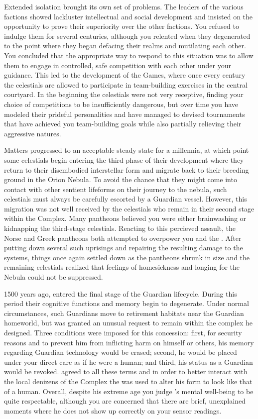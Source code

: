 \documentclass[char]{guardians}
\begin{document}
Extended isolation brought its own set of problems. The leaders of the various factions showed lackluster intellectual and social development and insisted on the opportunity to prove their superiority over the other factions. You refused to indulge them for several centuries, although you relented when they degenerated to the point where they began defacing their realms and mutilating each other. You concluded that the appropriate way to respond to this situation was to allow them to engage in controlled, safe competition with each other under your guidance. This led to the development of the Games, where once every century the celestials are allowed to participate in team-building exercises in the central courtyard. In the beginning the celestials were not very receptive, finding your choice of competitions to be insufficiently dangerous, but over time you have modeled their prideful personalities and have managed to devised tournaments that have achieved you team-building goals while also partially relieving their aggressive natures.

Matters progressed to an acceptable steady state for a millennia, at which point some celestials begin entering the third phase of their development where they return to their disembodied interstellar form and migrate back to their breeding ground in the Orion Nebula. To avoid the chance that they might come into contact with other sentient lifeforms on their journey to the nebula, such celestials must always be carefully escorted by a Guardian vessel. However, this migration was not well received by the celestials who remain in their second stage within the Complex. Many pantheons believed you were either brainwashing or kidnapping the third-stage celestials. Reacting to this percieved assault, the Norse and Greek pantheons both attempted to overpower you and the \cWarden{}. After putting down several such uprisings and repairing the resulting damage to the systems, things once again settled down as the pantheons shrunk in size and the remaining celestials realized that feelings of homesickness and longing for the Nebula could not be suppressed.

1500 years ago, \cJascha{} entered the final stage of the Guardian lifecycle. During this period their cognitive functions and memory begin to degenerate. Under normal circumstances, such Guardians move to retirement habitats near the Guardian homeworld, but \cJascha{} was granted an unusual request to remain within the complex he designed. Three conditions were imposed for this concession: first, for security reasons and to prevent him from inflicting harm on himself or others, his memory regarding Guardian technology would be erased; second, he would be placed under your direct care as if he were a human; and third, his status as a Guardian would be revoked. \cJascha{} agreed to all these terms and in order to better interact with the local denizens of the Complex the \assembler{} was used to alter his form to look like that of a human. Overall, despite his extreme age you judge \cJascha{}'s mental well-being to be quite respectable, although you are concerned that there are brief, unexplained moments where he does not show up correctly on your sensor readings.
\end{document}
